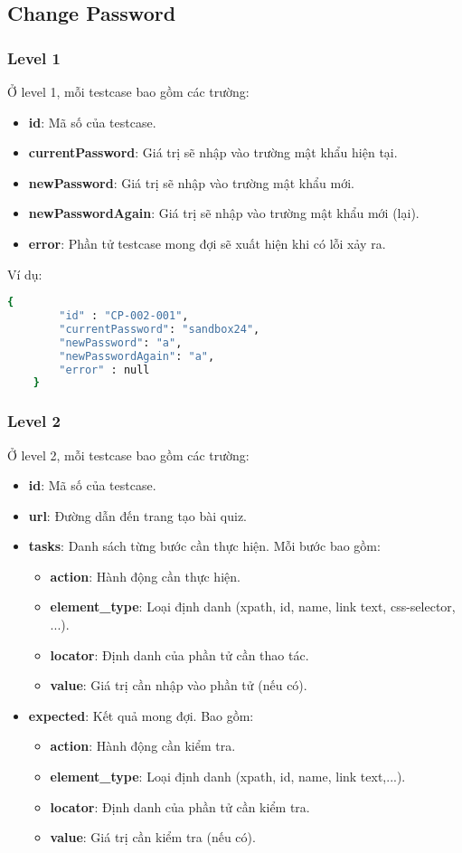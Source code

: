 \subsection{Change Password}
\subsubsection{Level 1}
Ở level 1, mỗi testcase bao gồm các trường:
\begin{itemize}
    \item \textbf{id}: Mã số của testcase.
    \item \textbf{currentPassword}: Giá trị sẽ nhập vào trường mật khẩu hiện tại.
    \item \textbf{newPassword}: Giá trị sẽ nhập vào trường mật khẩu mới.
    \item \textbf{newPasswordAgain}: Giá trị sẽ nhập vào trường mật khẩu mới (lại).
    \item \textbf{error}: Phần tử testcase mong đợi sẽ xuất hiện khi có lỗi xảy ra.
\end{itemize}

Ví dụ:
\begin{lstlisting}[language=bash, caption={Ví dụ testcase CP-002-001 ở level 1}]
    {
        "id" : "CP-002-001",
        "currentPassword": "sandbox24",
        "newPassword": "a",
        "newPasswordAgain": "a",
        "error" : null
    }
\end{lstlisting}
\subsubsection{Level 2}
Ở level 2, mỗi testcase bao gồm các trường:
\begin{itemize}
    \item \textbf{id}: Mã số của testcase.
    \item \textbf{url}: Đường dẫn đến trang tạo bài quiz.
    \item \textbf{tasks}: Danh sách từng bước cần thực hiện. Mỗi bước bao gồm:
\begin{itemize}
    \item \textbf{action}: Hành động cần thực hiện.
    \item \textbf{element\_type}: Loại định danh (xpath, id, name, link text, css-selector, ...).
    \item \textbf{locator}: Định danh của phần tử cần thao tác.
    \item \textbf{value}: Giá trị cần nhập vào phần tử (nếu có).
\end{itemize}
    \item \textbf{expected}: Kết quả mong đợi. Bao gồm:
\begin{itemize}
    \item \textbf{action}: Hành động cần kiểm tra.
    \item \textbf{element\_type}: Loại định danh (xpath, id, name, link text,...).
    \item \textbf{locator}: Định danh của phần tử cần kiểm tra.
    \item \textbf{value}: Giá trị cần kiểm tra (nếu có).
\end{itemize}
\end{itemize}

